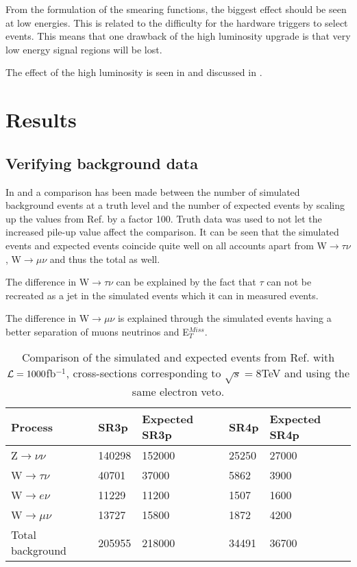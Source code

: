 From the formulation of the smearing functions, the biggest effect should be seen at low energies. This is related to the difficulty for the hardware triggers to select events. This means that one drawback of the high luminosity upgrade is that very low energy signal regions will be lost.

The effect of the high luminosity is seen in  and discussed in .

\newpage
\section{Results}\label{chap:sig:sec:res}
\subsection{Verifying background data}\label{Verifying background data}
In  and   a comparison has been made between the number of simulated background events at a truth level and the number of expected events by scaling up the values from Ref. \citep{ATLAS-CONF-2012-147} by a factor 100. Truth data was used to not let the increased pile-up value affect the comparison. It can be seen that the simulated events and expected events coincide quite well on all accounts apart from W$\rightarrow\tau\nu$, W$\rightarrow\mu\nu$ and thus the total as well. 

The difference in W$\rightarrow\tau\nu$ can be explained by the fact that $\tau$ can not be recreated as a jet in the simulated events which it can in measured events.

The difference in W$\rightarrow\mu\nu$ is explained through the simulated events having a better separation of muons neutrinos and E$_T^{Miss}$.

\begin{table}[ht]
\begin{center}
\begin{tabular}{|l|l|l|l|l|}
\hline
Process & SR3p & Expected SR3p & SR4p & Expected SR4p \\ \hline
Z$\rightarrow\nu\nu$ & 140298 & 152000 & 25250 & 27000 \\
W$\rightarrow\tau\nu$ & 40701 & 37000 & 5862 & 3900 \\
W$\rightarrow e\nu$ & 11229 & 11200 & 1507 & 1600 \\
W$\rightarrow\mu\nu$ & 13727 & 15800 & 1872 & 4200 \\ \hline
Total background & 205955 & 218000 & 34491 & 36700 \\ \hline
\end{tabular}
\caption{Comparison of the simulated and expected events from Ref. \citep{ATLAS-CONF-2012-147} with $\mathcal{L}=1000$fb$^{-1}$, cross-sections corresponding to $\sqrt{s}=8$TeV and using the same electron veto.}
\label{tab:Compare1}
\end{center}
\end{table}

